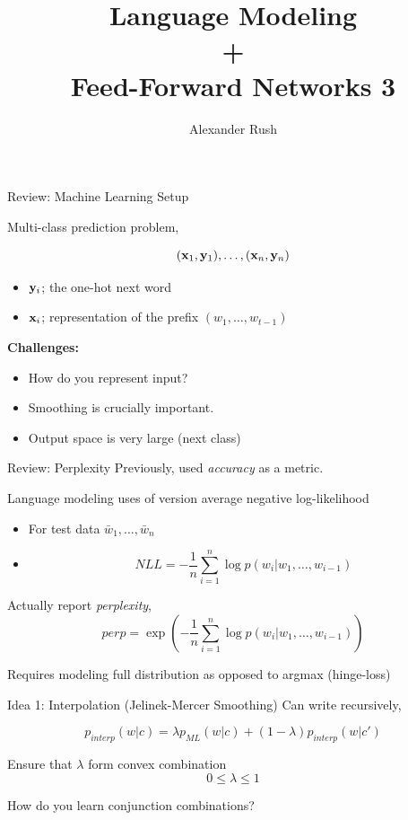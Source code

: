 \documentclass{beamer}
\title{Language Modeling \\ + \\ Feed-Forward Networks 3}
\date{}
\author{Alexander Rush}
\begin{document}
\begin{frame}
  \titlepage
\end{frame}

\begin{frame}{Review: Machine Learning Setup}

  Multi-class prediction problem, 

  \[ (\mathbf{x}_1, \mathbf{y}_1), \ldots, (\mathbf{x}_n, \mathbf{y}_n) \]
  \begin{itemize}
  \item $\mathbf{y}_i$; the one-hot next word
  \item $\mathbf{x}_i$; representation of the prefix $(w_1, \ldots, w_{t-1})$
  \end{itemize}
  \pause
  \textbf{Challenges:}
  \begin{itemize}
  \item How do you represent input?
  \item Smoothing is crucially important.
  \item Output space is very large (next class)
  \end{itemize}
\end{frame}

\begin{frame}{Review: Perplexity}
  Previously, used \textit{accuracy} as a metric.
  
  \air 

  Language modeling uses of version  average negative
  log-likelihood 
  \begin{itemize}
    \item For test data $\bar{w}_1, \ldots, \bar{w}_n$
    \item \[NLL = -\frac{1}{n}\sum_{i=1}^n \log p(w_i | w_1, \ldots,w_{i-1})\]
  \end{itemize}


  Actually report \textit{perplexity},
  \[ perp = \exp(-\frac{1}{n}\sum_{i=1}^n \log p(w_i | w_1, \ldots,w_{i-1})) \]

  Requires modeling full distribution as opposed to argmax (hinge-loss)
\end{frame}

\begin{frame}{Idea 1: Interpolation (Jelinek-Mercer Smoothing)}
  Can write recursively,

  \[ p_{interp}(w |  c) =  \lambda p_{ML}(w |  c) + (1 - \lambda) p_{interp}(w | c') \]

  Ensure that $\lambda$ form convex combination
  \[0 \leq \lambda \leq 1\]

  How do you learn conjunction combinations?
\end{frame}
\end{document}

